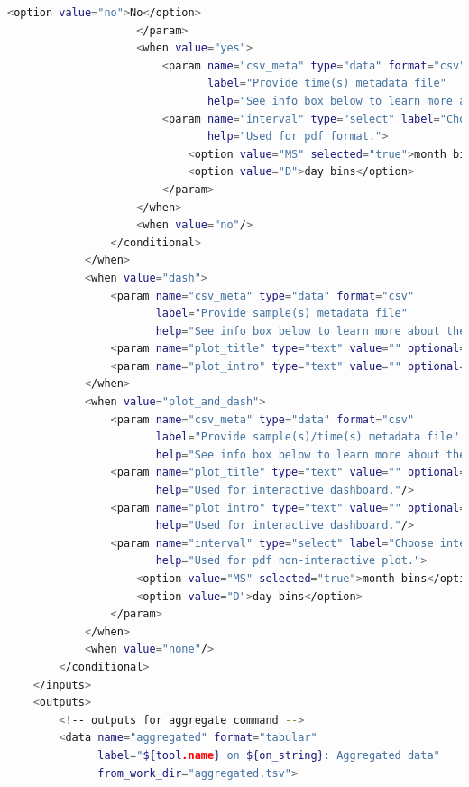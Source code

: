 \begin{lstlisting}[language=bash, caption=tool wrapper for Freyja: Aggregate and visualize demixed results, label=list:methods:wrapper-freyja-agg]
                        <option value="no">No</option>
                    </param>
                    <when value="yes">
                        <param name="csv_meta" type="data" format="csv"
                               label="Provide time(s) metadata file"
                               help="See info box below to learn more about the form of meta-file. Accepts only CSV (.csv) files"/>
                        <param name="interval" type="select" label="Choose interval" display="radio"
                               help="Used for pdf format.">
                            <option value="MS" selected="true">month bins</option>
                            <option value="D">day bins</option>
                        </param>
                    </when>
                    <when value="no"/>
                </conditional>
            </when>
            <when value="dash">
                <param name="csv_meta" type="data" format="csv"
                       label="Provide sample(s) metadata file"
                       help="See info box below to learn more about the form of meta-file. Accepts only CSV (.csv) files"/>
                <param name="plot_title" type="text" value="" optional="true" label="Title"/>
                <param name="plot_intro" type="text" value="" optional="true" label="Introduction"/>
            </when>
            <when value="plot_and_dash">
                <param name="csv_meta" type="data" format="csv"
                       label="Provide sample(s)/time(s) metadata file"
                       help="See info box below to learn more about the form of meta-file. Accepts only CSV (.csv) files"/>
                <param name="plot_title" type="text" value="" optional="true" label="Title"
                       help="Used for interactive dashboard."/>
                <param name="plot_intro" type="text" value="" optional="true" label="Introduction"
                       help="Used for interactive dashboard."/>
                <param name="interval" type="select" label="Choose interval" display="radio"
                       help="Used for pdf non-interactive plot.">
                    <option value="MS" selected="true">month bins</option>
                    <option value="D">day bins</option>
                </param>
            </when>
            <when value="none"/>
        </conditional>
    </inputs>
    <outputs>
        <!-- outputs for aggregate command -->
        <data name="aggregated" format="tabular"
              label="${tool.name} on ${on_string}: Aggregated data"
              from_work_dir="aggregated.tsv">

\end{lstlisting}

